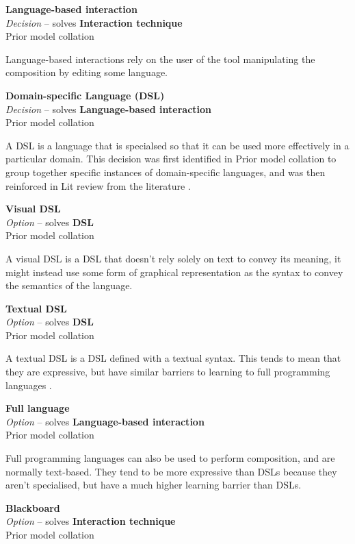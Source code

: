 \textbf{Language-based interaction} \\ \emph{Decision} -- solves \textbf{Interaction technique} \\ Prior model collation \cite{Minhas2012}

Language-based interactions rely on the user of the tool manipulating the composition by editing some language.

\textbf{Domain-specific Language (DSL)} \\ \emph{Decision} -- solves \textbf{Language-based interaction} \\ Prior model collation 

A DSL is a language that is specialsed so that it can be used more effectively in a particular domain. This decision was first identified in Prior model collation to group together specific instances of domain-specific languages, and was then reinforced in Lit review from the literature \cite{Skrobo2011}.

\textbf{Visual DSL} \\ \emph{Option} -- solves \textbf{DSL} \\ Prior model collation \cite{Grammel2010,Aghaee2012}

A visual DSL is a DSL that doesn't rely solely on text to convey its meaning, it might instead use some form of graphical representation as the syntax to convey the semantics of the language.

\textbf{Textual DSL} \\ \emph{Option} -- solves \textbf{DSL} \\ Prior model collation \cite{Aghaee2012}

A textual DSL is a DSL defined with a textual syntax. This tends to mean that they are expressive, but have similar barriers to learning to full programming languages \cite{Aghaee2012}.

\textbf{Full language} \\ \emph{Option} -- solves \textbf{Language-based interaction} \\ Prior model collation \cite{Fischer2009,Pietschmann2010}

Full programming languages can also be used to perform composition, and are normally text-based. They tend to be more expressive than DSLs because they aren't specialised, but have a much higher learning barrier than DSLs.

\textbf{Blackboard} \\ \emph{Option} -- solves \textbf{Interaction technique} \\ Prior model collation \cite{Aghaee2012}


